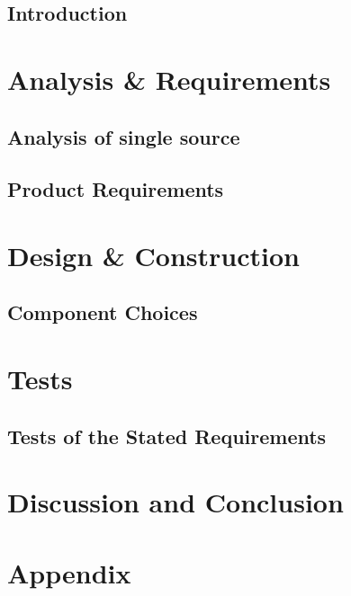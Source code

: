 \glsresetall
 \graphicspath{{figures/analysing/}}
\chapter{Introduction}

\part{Analysis \& Requirements}\label{pt:analysis} \glsresetall
 \graphicspath{{figures/analysing/}}
 \chapter{Analysis of single source}\label{ch:analysing}
% 
 

\chapter{Product Requirements}
%



\part{Design \& Construction}\label{pt:design} 
\graphicspath{{figures/design/}}
\chapter{Component Choices}
%


 \graphicspath{{figures/tests/}}
\part{Tests}\label{pt:tests}
\chapter{Tests of the Stated Requirements}
%


 
\part{Discussion and Conclusion}\label{pt:conclusions}
% 
%

\glsresetall
\appendix %

 \graphicspath{{figures/appendix/}}
\part{Appendix}\label{pt:appendix}
%
